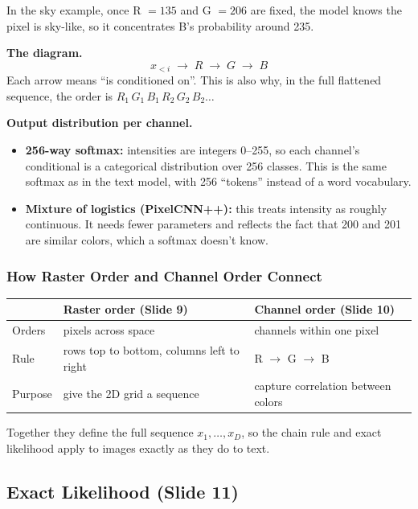 In the sky example, once R $=135$ and G $=206$ are fixed, the model knows the pixel is sky-like, so it concentrates B's probability around 235.

\textbf{The diagram.}
$$x_{<i} \;\rightarrow\; R \;\rightarrow\; G \;\rightarrow\; B$$
Each arrow means ``is conditioned on''. This is also why, in the full flattened sequence, the order is $R_1\, G_1\, B_1\, R_2\, G_2\, B_2 \dots$

\textbf{Output distribution per channel.}
\begin{itemize}
  \item \textbf{256-way softmax:} intensities are integers 0--255, so each channel's conditional is a categorical distribution over 256 classes. This is the same softmax as in the text model, with 256 ``tokens'' instead of a word vocabulary.
  \item \textbf{Mixture of logistics (PixelCNN++):} this treats intensity as roughly continuous. It needs fewer parameters and reflects the fact that 200 and 201 are similar colors, which a softmax doesn't know.
\end{itemize}

\subsubsection*{How Raster Order and Channel Order Connect}

\begin{center}
\begin{tabular}{lll}
\toprule
 & Raster order (Slide 9) & Channel order (Slide 10) \\
\midrule
Orders  & pixels across space & channels within one pixel \\
Rule    & rows top to bottom, columns left to right & R $\rightarrow$ G $\rightarrow$ B \\
Purpose & give the 2D grid a sequence & capture correlation between colors \\
\bottomrule
\end{tabular}
\end{center}

Together they define the full sequence $x_1, \dots, x_D$, so the chain rule and exact likelihood apply to images exactly as they do to text.


\subsection*{Exact Likelihood (Slide 11)}

